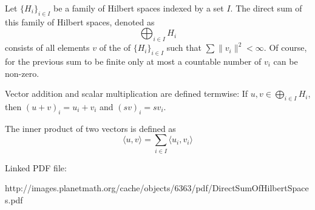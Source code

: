 \documentclass[12pt]{article}
\begin{document}
Let $\{H_i\}_{i \in I}$ be a family of Hilbert spaces indexed by a set $I$.  The direct sum of this family of Hilbert spaces, denoted as
 $$\bigoplus_{i \in I} H_i$$
consists of all elements $v$ of the  of $\{H_i\}_{i \in I}$ such that $\sum \| v_i\|^2 < \infty$. Of course, for the previous sum to be finite only at most a countable number of $v_i$ can be non-zero.

Vector addition and scalar multiplication are defined termwise:  If $u, v \in \bigoplus_{i \in I} H_i$, then $(u+v)_i = u_i + v_i$ and $(sv)_i = s v_i$.

 The inner product of two vectors is defined as
 $$\langle u, v \rangle = \sum_{i \in I} \langle u_i, v_i \rangle$$


Linked PDF file:

http://images.planetmath.org/cache/objects/6363/pdf/DirectSumOfHilbertSpaces.pdf

\end{document}
